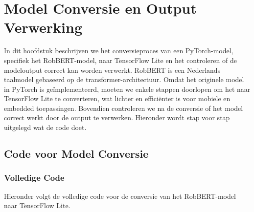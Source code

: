 \chapter{Model Conversie en Output Verwerking }
\label{ch:modelconversie-verwerking}

In dit hoofdstuk beschrijven we het conversieproces van een PyTorch-model, specifiek het RobBERT-model, naar TensorFlow Lite en het controleren of de modeloutput correct kan worden verwerkt. RobBERT is een Nederlands taalmodel gebaseerd op de transformer-architectuur. Omdat het originele model in PyTorch is geïmplementeerd, moeten we enkele stappen doorlopen om het naar TensorFlow Lite te converteren, wat lichter en efficiënter is voor mobiele en embedded toepassingen. Bovendien controleren we na de conversie of het model correct werkt door de output te verwerken. Hieronder wordt stap voor stap uitgelegd wat de code doet.

\section{Code voor Model Conversie}

\subsection{Volledige Code}

Hieronder volgt de volledige code voor de conversie van het RobBERT-model naar TensorFlow Lite.

